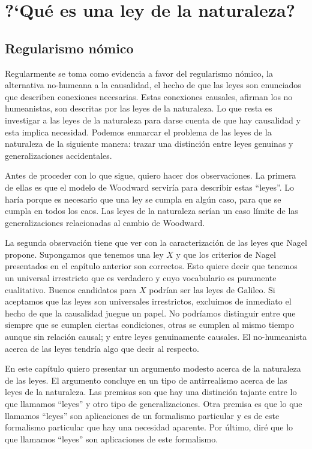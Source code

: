 \chapter{?`Qué es una ley de la naturaleza?}

\section{Regularismo nómico}

\noindent Regularmente se toma como evidencia a favor del regularismo nómico, la alternativa no-humeana a la causalidad, el hecho de que las leyes son enunciados que describen conexiones necesarias. Estas conexiones causales, afirman los no humeanistas, son descritas por las leyes de la naturaleza. Lo que resta es investigar a las leyes de la naturaleza para darse cuenta de que hay causalidad y esta implica necesidad. Podemos enmarcar el problema de las leyes de la naturaleza de la siguiente manera: trazar una distinción entre leyes genuinas y generalizaciones accidentales.

Antes de proceder con lo que sigue, quiero hacer dos observaciones. La primera de ellas es que el modelo de Woodward serviría para describir estas ``leyes''. Lo haría porque es necesario que una ley se cumpla en algún caso, para que se cumpla en todos los caos. Las leyes de la naturaleza serían un caso límite de las generalizaciones relacionadas al cambio de Woodward.

La segunda observación tiene que ver con la caracterización de las leyes que Nagel propone. Supongamos que tenemos una ley $X$ y que los criterios de Nagel presentados en el capítulo anterior son correctos. Esto quiere decir que tenemos un universal irrestricto que es verdadero y cuyo vocabulario es puramente cualitativo. Buenos candidatos para $X$ podrían ser las leyes de Galileo. Si aceptamos que las leyes son universales irrestrictos, excluimos de inmediato el hecho de que la causalidad juegue un papel. No podríamos distinguir entre que siempre que se cumplen ciertas condiciones, otras se cumplen al mismo tiempo aunque sin relación causal; y entre leyes genuinamente causales. El no-humeanista acerca de las leyes tendría algo que decir al respecto.

En este capítulo quiero presentar un argumento modesto acerca de la naturaleza de las leyes. El argumento concluye en un tipo de antirrealismo acerca de las leyes de la naturaleza. Las premisas son que hay una distinción tajante entre lo que llamamos ``leyes'' y otro tipo de generalizaciones. Otra premisa es que lo que llamamos ``leyes'' son aplicaciones de un formalismo particular y es de este formalismo particular que hay una necesidad aparente. Por último, diré que lo que llamamos ``leyes'' son aplicaciones de este formalismo.


